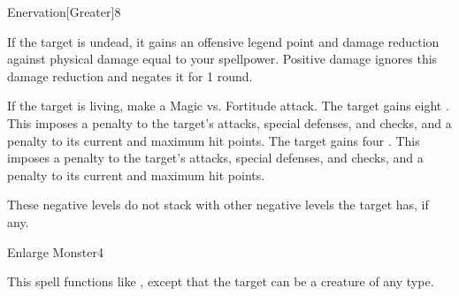 \begin{spellsection}{Enervation}[Greater]{8}
    \begin{spellheader}
    \end{spellheader}
    \begin{spellcontent}
        \begin{spelltargetinginfo}
        \end{spelltargetinginfo}
        \begin{spelleffects}
            \spelleffect If the target is undead, it gains an offensive legend point and damage reduction against physical damage equal to your spellpower. Positive damage ignores this damage reduction and negates it for 1 round.
            \begin{spellattacktriggered}{If the target is living, make a Magic vs. Fortitude attack.}
                \spellsuccess The target gains eight . This imposes a  penalty to the target's attacks, special defenses, and checks, and a  penalty to its current and maximum hit points.
                \spellsuccess The target gains four . This imposes a  penalty to the target's attacks, special defenses, and checks, and a  penalty to its current and maximum hit points.
            \end{spellattacktriggered}
        \end{spelleffects}
    \end{spellcontent}
    \begin{spellfooter}
        \spellnotes These negative levels do not stack with other negative levels the target has, if any.
        \miscastrandom
    \end{spellfooter}
\end{spellsection}

\begin{spellsection}{Enlarge Monster}{4}
    \begin{spellheader}
    \end{spellheader}
    \begin{spellcontent}
        \begin{spelltargetinginfo}
        \end{spelltargetinginfo}
        \begin{spelleffects}
            \spellspecial This spell functions like , except that the target can be a creature of any type.
        \end{spelleffects}
    \end{spellcontent}
    \begin{spellfooter}
        \spellnotes \sizingspellnotes
        \miscastrandom
    \end{spellfooter}
\end{spellsection}

